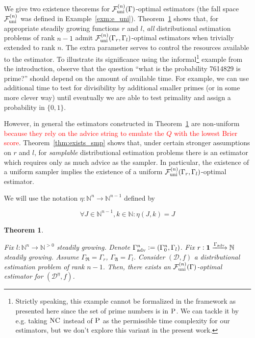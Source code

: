 \documentclass[11pt]{article}
\numberwithin{equation}{section}
\theoremstyle{definition}
\theoremstyle{plain}
\newtheorem{theorem}{Theorem}[section]
\newcommand{\Nats}{\mathbb{N}}
\newcommand{\NatFun}{\Nats^n \rightarrow}
\newcommand{\Dist}{\mathcal{D}}
\newcommand{\GrowR}{\Gamma_{\mathfrak{R}}}
\newcommand{\GrowA}{\Gamma_{\mathfrak{A}}}
\newcommand{\Fall}{\mathcal{F}}
\newcommand{\FallU}{{\Fall_{\textnormal{uni}}^{(n)}}}
\begin{document}
We give two existence theorems for ${\FallU(\Gamma)}$-optimal estimators (the fall space $\FallU$ was defined in Example~\ref{exm:e_uni}). Theorem~\ref{thm:exists_all} shows that, for appropriate steadily growing functions ${r}$ and ${l}$, \emph{all} distributional estimation problems of rank ${n-1}$ admit ${\FallU(\Gamma_r,\Gamma_l)}$-optimal estimators when trivially extended to rank ${n}$. The extra parameter serves to control the resources available to the estimator. To illustrate its significance using the informal\footnote{Strictly speaking, this example cannot be formalized in the framework as presented here since the set of prime numbers is in $\textsc{P}$. We can tackle it by e.g. taking ${\textsc{NC}}$ instead of ${\textsc{P}}$ as the permissible time complexity for our estimators, but we don't explore this variant in the present work.} example from the introduction, observe that the question \enquote{what is the probability 7614829 is prime?} should depend on the amount of available time. For example, we can use additional time to test for divisibility by additional smaller primes (or in some more clever way) until eventually we are able to test primality and assign a probability in $\{0,1\}$. 

However, in general the estimators constructed in Theorem~\ref{thm:exists_all} are non-uniform \textcolor{red}{because they rely on the advice string to emulate the $Q$ with the lowest Brier score}. Theorem~\ref{thm:exists_smp} shows that, under certain stronger assumptions on ${r}$ and ${l}$, for \emph{samplable} distributional estimation problems there is an estimator which requires only as much advice as the sampler. In particular, the existence of a uniform sampler implies the existence of a uniform ${\FallU(\Gamma_r,\Gamma_l)}$-optimal estimator.

We will use the notation ${\eta: \NatFun \Nats^{n-1}}$ defined by

\[\forall J \in \Nats^{n-1}, k \in \Nats: \eta(J,k)=J\]

\begin{samepage}
\begin{theorem}
\label{thm:exists_all}

Fix ${l: \NatFun \Nats^{>0}}$ steadily growing. Denote ${\Gamma_{\textnormal{adv}}^n:=(\Gamma_0^n,\Gamma_l)}$. Fix ${r: \bm{1} \xrightarrow{\Gamma_{\textnormal{adv}}}\Nats}$ steadily growing. Assume ${\GrowR=\Gamma_r}$, ${\GrowA=\Gamma_l}$. Consider ${(\Dist,f)}$ a distributional estimation problem of rank ${n-1}$. Then, there exists an ${\FallU(\Gamma)}$-optimal estimator for ${(\Dist^\eta,f)}$.

\end{theorem}
\end{samepage}
\end{document}

